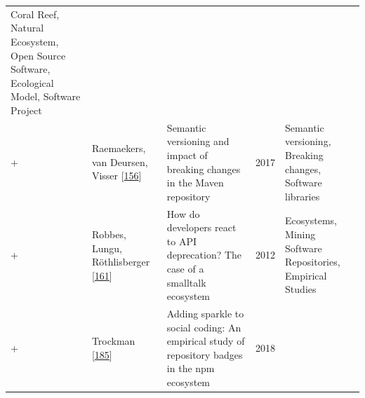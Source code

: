 \documentclass[]{book}
\begin{document}
\begin{longtable}[]{@{}lllll@{}}
\begin{minipage}[t]{0.39\columnwidth}
Coral Reef, Natural Ecosystem, Open Source Software, Ecological Model,
Software Project\strut
\end{minipage}\tabularnewline
\begin{minipage}[t]{0.01\columnwidth}\raggedright\strut
+\strut
\end{minipage} & \begin{minipage}[t]{0.09\columnwidth}\raggedright\strut
Raemaekers, van Deursen, Visser
{[}\protect\hyperlink{ref-Raemaekers2017}{156}{]}\strut
\end{minipage} & \begin{minipage}[t]{0.34\columnwidth}\raggedright\strut
Semantic versioning and impact of breaking changes in the Maven
repository\strut
\end{minipage} & \begin{minipage}[t]{0.02\columnwidth}\raggedright\strut
2017\strut
\end{minipage} & \begin{minipage}[t]{0.39\columnwidth}\raggedright\strut
Semantic versioning, Breaking changes, Software libraries\strut
\end{minipage}\tabularnewline
\begin{minipage}[t]{0.01\columnwidth}\raggedright\strut
+\strut
\end{minipage} & \begin{minipage}[t]{0.09\columnwidth}\raggedright\strut
Robbes, Lungu, Röthlisberger
{[}\protect\hyperlink{ref-Robbes2012}{161}{]}\strut
\end{minipage} & \begin{minipage}[t]{0.34\columnwidth}\raggedright\strut
How do developers react to API deprecation? The case of a smalltalk
ecosystem\strut
\end{minipage} & \begin{minipage}[t]{0.02\columnwidth}\raggedright\strut
2012\strut
\end{minipage} & \begin{minipage}[t]{0.39\columnwidth}\raggedright\strut
Ecosystems, Mining Software Repositories, Empirical Studies\strut
\end{minipage}\tabularnewline
\begin{minipage}[t]{0.01\columnwidth}\raggedright\strut
+\strut
\end{minipage} & \begin{minipage}[t]{0.09\columnwidth}\raggedright\strut
Trockman {[}\protect\hyperlink{ref-Trockman2018}{185}{]}\strut
\end{minipage} & \begin{minipage}[t]{0.34\columnwidth}\raggedright\strut
Adding sparkle to social coding: An empirical study of repository badges
in the npm ecosystem\strut
\end{minipage} & \begin{minipage}[t]{0.02\columnwidth}\raggedright\strut
2018\strut
\end{minipage} & \begin{minipage}[t]{0.39\columnwidth}\raggedright\strut
\strut
\end{minipage}\tabularnewline
\bottomrule
\end{longtable}
\end{document}
